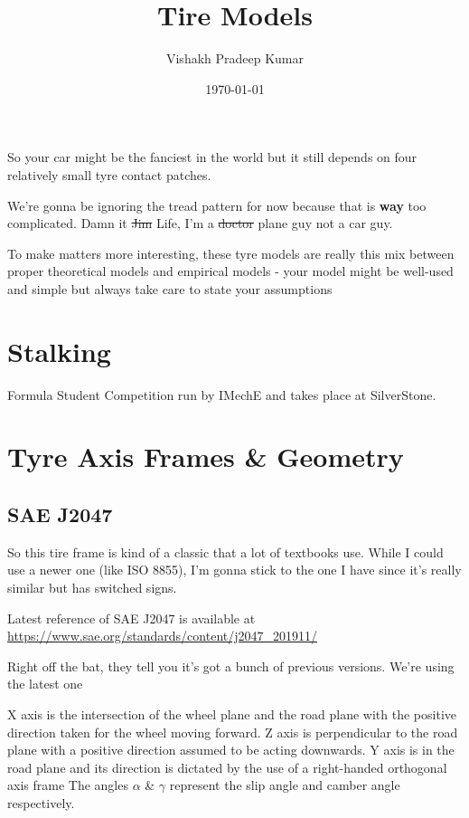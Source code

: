 \documentclass[11pt]{article}
\author{Vishakh Pradeep Kumar}
\date{\today}
\title{Tire Models}
\begin{document}
\maketitle
\tableofcontents

So your car might be the fanciest in the world but it still depends on four relatively small tyre contact patches.

We're gonna be ignoring the tread pattern for now because that is \textbf{way} too complicated. Damn it \sout{Jim} Life, I'm a \sout{doctor} plane guy not a car guy.

To make matters more interesting, these tyre models are really this mix between proper theoretical models and empirical models - your model might be well-used and simple but always take care to state your assumptions

\section{Stalking}
\label{sec:org1915446}

Formula Student Competition run by IMechE and takes place at SilverStone.


\section{Tyre Axis Frames \& Geometry}
\label{sec:org63424fa}
\subsection{SAE J2047}
\label{sec:org3632628}

So this tire frame is kind of a classic that a lot of textbooks use. While I could use a newer one (like ISO 8855), I'm gonna stick to the one I have since it's really similar but has switched signs. 

Latest reference of SAE J2047 is available at \url{https://www.sae.org/standards/content/j2047\_201911/}

Right off the bat, they tell you it's got a bunch of previous versions. We're using the latest one 

X axis is the intersection of the wheel plane and the road plane with the positive direction taken for the wheel moving forward.
Z axis is perpendicular to the road plane with a positive direction assumed to be acting downwards.
Y axis is in the road plane and its direction is dictated by the use of a right-handed orthogonal axis frame
The angles \(\alpha\) \& \(\gamma\) represent the slip angle and camber angle respectively.

\begin{figure}[!ht]
 \centering
 
\end{figure}
\end{document}
